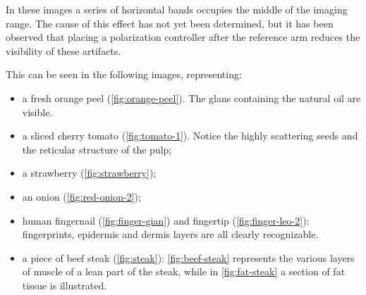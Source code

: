 %
%





In these images a series of horizontal bands occupies the middle of the imaging range. The cause of this effect has not yet been determined, but it has been observed that placing a polarization controller after the reference arm reduces the visibility of these artifacts. 

This can be seen in the following images, representing:
\begin{itemize}
	\item a fresh orange peel (\autoref{fig:orange-peel}). The glans containing the natural oil are visible.
	
	\item a sliced cherry tomato (\autoref{fig:tomato-1}). Notice the highly scattering seeds and the reticular structure of the pulp;
	
	\item a strawberry (\autoref{fig:strawberry});
	
	\item an onion (\autoref{fig:red-onion-2});
	
	\item human fingernail (\autoref{fig:finger-gian}) and fingertip (\autoref{fig:finger-leo-2}): fingerprints, epidermis and dermis layers are all clearly recognizable.
	
	\item a piece of beef steak (\autoref{fig:steak}): \autoref{fig:beef-steak} represents the various layers of muscle of a lean part of the steak, while in \autoref{fig:fat-steak} a section of fat tissue is illustrated.
\end{itemize}

